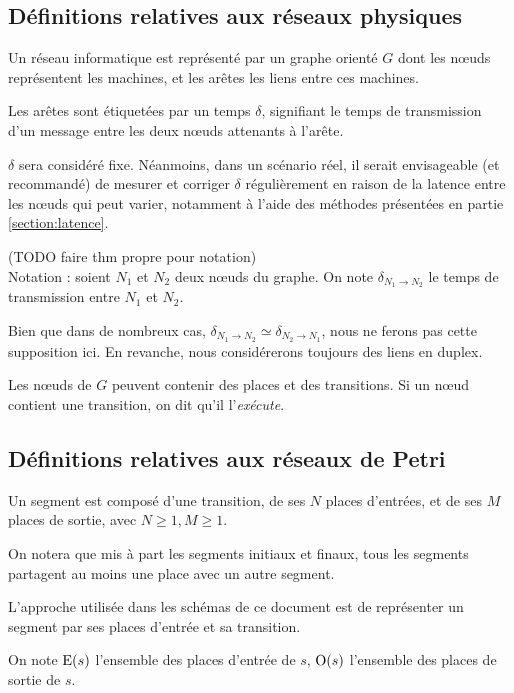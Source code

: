 \subsection{Définitions relatives aux réseaux physiques}
\begin{mydef}
Un réseau informatique est représenté par un graphe orienté $G$ dont les nœuds représentent les machines, et les arêtes les liens entre ces machines. 

Les arêtes sont étiquetées par un temps $\delta$, signifiant le temps de transmission d'un message entre les deux nœuds attenants à l'arête.
\end{mydef}
$\delta$ sera considéré fixe. Néanmoins, dans un scénario réel, il serait envisageable (et recommandé) de mesurer et corriger $\delta$ régulièrement en raison de la latence entre les nœuds qui peut varier, notamment à l'aide des méthodes présentées en partie \ref{section:latence}.

(TODO faire thm propre pour notation) \\
Notation : soient $N_1$ et $N_2$ deux nœuds du graphe. On note $\delta_{N_1 \rightarrow N_2}$ le temps de transmission entre $N_1$ et $N_2$. 

Bien que dans de nombreux cas, $\delta_{N_1 \rightarrow N_2} \simeq \delta_{N_2 \rightarrow N_1}$, nous ne ferons pas cette supposition ici. En revanche, nous considérerons toujours des liens en duplex.

Les nœuds de $G$ peuvent contenir des places et des transitions. Si un nœud contient une transition, on dit qu'il l'\textit{exécute}.

\subsection{Définitions relatives aux réseaux de Petri}
\begin{mydef}
Un segment est composé d'une transition, de ses $N$ places d'entrées, et de ses $M$ places de sortie, avec $N \geq 1, M \geq 1$.
\end{mydef}

On notera que mis à part les segments initiaux et finaux, tous les segments partagent au moins une place avec un autre segment.

L'approche utilisée dans les schémas de ce document est de représenter un segment par ses places d'entrée et sa transition.

\begin{mynot}
On note $\operatorname{E}(s)$ l'ensemble des places d'entrée de $s$, $\operatorname{O}(s)$ l'ensemble des places de sortie de $s$.
\end{mynot}

